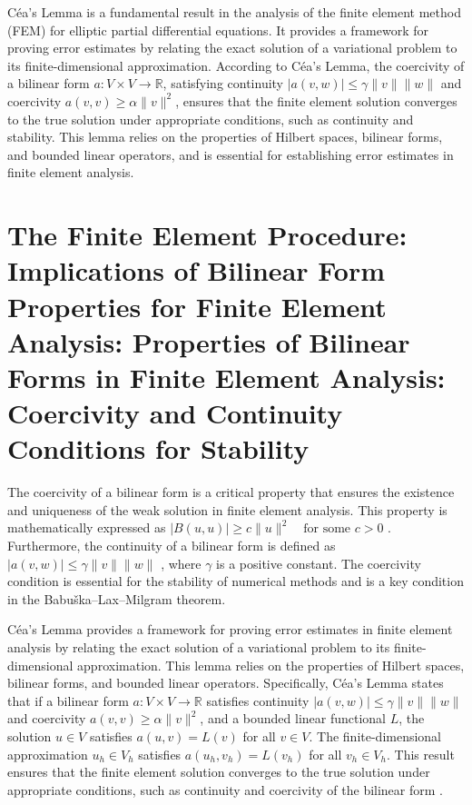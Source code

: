 \documentclass[12pt, a4paper]{article}
\begin{document}
Céa's Lemma is a fundamental result in the analysis of the finite element method (FEM) for elliptic partial differential equations. It provides a framework for proving error estimates by relating the exact solution of a variational problem to its finite-dimensional approximation. According to Céa's Lemma, the coercivity of a bilinear form \(a: V \times V \rightarrow \mathbb{R}\), satisfying continuity \(|a(v, w)| \leq \gamma \|v\| \|w\|\) and coercivity \(a(v, v) \geq \alpha \|v\|^2\), ensures that the finite element solution converges to the true solution under appropriate conditions, such as continuity and stability. This lemma relies on the properties of Hilbert spaces, bilinear forms, and bounded linear operators, and is essential for establishing error estimates in finite element analysis.

\section{The Finite Element Procedure: Implications of Bilinear Form Properties for Finite Element Analysis: Properties of Bilinear Forms in Finite Element Analysis: Coercivity and Continuity Conditions for Stability}
\label{sec:e5b16fad-2ea6-439d-aff9-c587265c592c}

The coercivity of a bilinear form is a critical property that ensures the existence and uniqueness of the weak solution in finite element analysis. This property is mathematically expressed as \(|B(u, u)| \geq c\|u\|^2 \quad \text{for some } c > 0\) \cite{src:wiki_babu_ka_lax_milgram_theorem-a334b87f26cc}. Furthermore, the continuity of a bilinear form is defined as \(|a(v, w)| \leq \gamma \|v\| \|w\|\) \cite{src:wiki_c_a_s_lemma-c997aed28ad6}, where \(\gamma\) is a positive constant. The coercivity condition is essential for the stability of numerical methods and is a key condition in the Babuška–Lax–Milgram theorem.

Céa's Lemma provides a framework for proving error estimates in finite element analysis by relating the exact solution of a variational problem to its finite-dimensional approximation. This lemma relies on the properties of Hilbert spaces, bilinear forms, and bounded linear operators. Specifically, Céa's Lemma states that if a bilinear form \(a: V \times V \rightarrow \mathbb{R}\) satisfies continuity \(|a(v, w)| \leq \gamma \|v\| \|w\|\) and coercivity \(a(v, v) \geq \alpha \|v\|^2\), and a bounded linear functional \(L\), the solution \(u \in V\) satisfies \(a(u, v) = L(v)\) for all \(v \in V\). The finite-dimensional approximation \(u_h \in V_h\) satisfies \(a(u_h, v_h) = L(v_h)\) for all \(v_h \in V_h\). This result ensures that the finite element solution converges to the true solution under appropriate conditions, such as continuity and coercivity of the bilinear form \cite{src:wiki_c_a_s_lemma-c997aed28ad6}.
\end{document}
